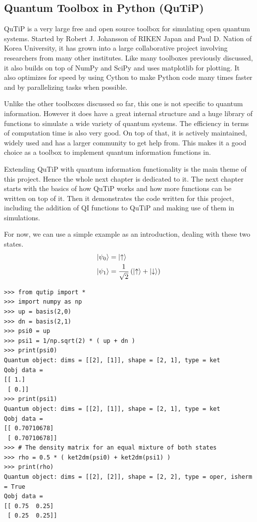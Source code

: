\subsection{Quantum Toolbox in Python (QuTiP)}
QuTiP \cite{qutipdoc} is a very large free and open source toolbox for simulating open quantum systems. Started by Robert J. Johansson of RIKEN Japan and Paul D. Nation of Korea University, it has grown into a large collaborative project involving researchers from many other institutes. Like many toolboxes previously discussed, it also builds on top of NumPy and SciPy and uses matplotlib for plotting. It also optimizes for speed by using Cython to make Python code many times faster and by parallelizing tasks when possible.
\par Unlike the other toolboxes discussed so far, this one is not specific to quantum information. However it does have a great internal structure and a huge library of functions to simulate a wide variety of quantum systems. The efficiency in terms of computation time is also very good. On top of that, it is actively maintained, widely used and has a larger community to get help from. This makes it a good choice as a toolbox to implement quantum information functions in.
\par Extending QuTiP with quantum information functionality is the main theme of this project. Hence the whole next chapter is dedicated to it. The next chapter starts with the basics of how QuTiP works and how more functions can be written on top of it. Then it demonstrates the code written for this project, including the addition of QI functions to QuTiP and making use of them in simulations.
\par For now, we can use a simple example as an introduction, dealing with these two states.
\begin{align*}
\ket{\psi_0} &= \ket{\uparrow} \\
\ket{\psi_1} &= \frac{1}{\sqrt{2}} \left( \ket{\uparrow} + \ket{\downarrow} \right)
\end{align*}

\begin{verbatim}
>>> from qutip import *
>>> import numpy as np
>>> up = basis(2,0)
>>> dn = basis(2,1)
>>> psi0 = up
>>> psi1 = 1/np.sqrt(2) * ( up + dn )
>>> print(psi0)
Quantum object: dims = [[2], [1]], shape = [2, 1], type = ket
Qobj data =
[[ 1.]
 [ 0.]]
>>> print(psi1)
Quantum object: dims = [[2], [1]], shape = [2, 1], type = ket
Qobj data =
[[ 0.70710678]
 [ 0.70710678]]
>>> # The density matrix for an equal mixture of both states
>>> rho = 0.5 * ( ket2dm(psi0) + ket2dm(psi1) )
>>> print(rho)
Quantum object: dims = [[2], [2]], shape = [2, 2], type = oper, isherm = True
Qobj data =
[[ 0.75  0.25]
 [ 0.25  0.25]]
\end{verbatim}

